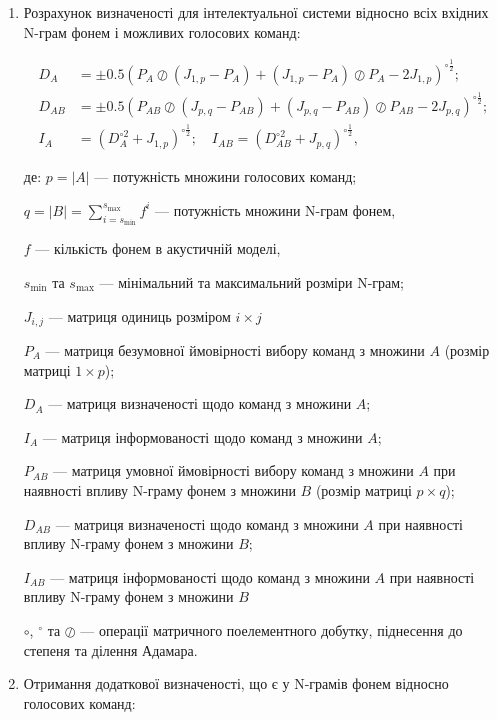 \begin{enumerate}
	\item Розрахунок визначеності для інтелектуальної системи відносно всіх вхідних N-грам фонем і можливих голосових команд:
	
	\begin{align}
		D_A&=\pm0.5(P_{A}\oslash(J_{1,p}-P_{A}) + (J_{1,p}-P_{A})\oslash P_{A} -2J_{1,p})^{\circ \frac{1}{2}}; \nonumber \\
		D_{AB}&=\pm0.5(P_{AB}\oslash(J_{p,q}-P_{AB}) + (J_{p,q}-P_{AB})\oslash P_{AB}-2J_{p,q})^{\circ \frac{1}{2}}; \nonumber \\
		I_A&=(D_A^{\circ 2}+J_{1,p})^{\circ \frac{1}{2}};\quad I_{AB}=(D_{AB}^{\circ 2}+J_{p,q})^{\circ \frac{1}{2}}, \nonumber
	\end{align}
	
	де: $p=|A|$ --- потужність множини голосових команд;
	
	{\settowidth{\leftskip}{де:\ }
		
		$q=|B|=\sum_{i=s_{\text{min}}}^{s_{\text{max}}}f^i$ --- потужність множини N-грам фонем,
		
		$f$ --- кількість фонем в акустичній моделі,
		
		$s_{\text{min}}$ та $s_{\text{max}}$ --- мінімальний та максимальний розміри N-грам;
		
		$J_{i,j}$ --- матриця одиниць розміром $i\times j$
		
		$P_{A}$ --- матриця безумовної ймовірності вибору команд з множини $A$ (розмір матриці $1\times p$); 
		
		$D_A$ --- матриця визначеності щодо команд з множини $A$; 
		
		$I_A$ --- матриця інформованості щодо команд з множини $A$; 
		
		$P_{AB}$ --- матриця умовної ймовірності вибору команд з множини $A$ при наявності впливу N-граму фонем з множини $B$ (розмір матриці $p\times q$); 
		
		$D_{AB}$ --- матриця визначеності щодо команд з множини $A$ при наявності впливу N-граму фонем з множини $B$; 
		
		$I_{AB}$ --- матриця інформованості щодо команд з множини $A$ при наявності впливу N-граму фонем з множини $B$
		
		$\circ$, ${}^{\circ}$ та $\oslash$ --- операції матричного поелементного добутку, піднесення до степеня та ділення Адамара.
		
	}
	
	\item Отримання додаткової визначеності, що є у N-грамів фонем відносно голосових команд:
	

\end{enumerate}
